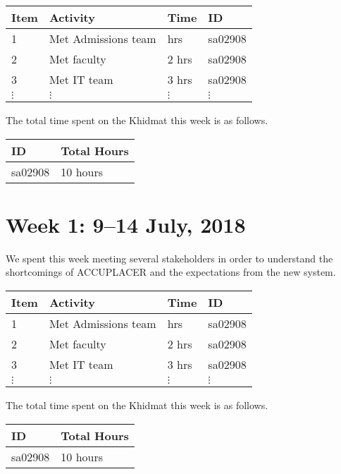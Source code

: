 \documentclass{article}
\begin{document}
\begin{tabular}{|l|l|l|l|}
  \hline
  Item  & Activity & Time & ID \\\hline\hline
  1 & Met Admissions team & hrs & sa02908 \\\hline
  2 & Met faculty & 2 hrs & sa02908 \\\hline
  3 & Met IT team & 3 hrs & sa02908 \\\hline
  $\vdots$ & $\vdots$ & $\vdots$ & $\vdots$ \\\hline
\end{tabular}

The total time spent on the Khidmat this week is as follows.

\begin{tabular}{|l|l|}
  \hline
  ID & Total Hours\\\hline\hline
  sa02908 & 10 hours\\\hline
\end{tabular}


\newpage %
\section*{Week 1: 9--14 July, 2018}

We spent this week meeting several stakeholders in order to understand the shortcomings of ACCUPLACER and the expectations from the new system.

\begin{tabular}{|l|l|l|l|}
  \hline
  Item  & Activity & Time & ID \\\hline\hline
  1 & Met Admissions team & hrs & sa02908 \\\hline
  2 & Met faculty & 2 hrs & sa02908 \\\hline
  3 & Met IT team & 3 hrs & sa02908 \\\hline
  $\vdots$ & $\vdots$ & $\vdots$ & $\vdots$ \\\hline
\end{tabular}

The total time spent on the Khidmat this week is as follows.

\begin{tabular}{|l|l|}
  \hline
  ID & Total Hours\\\hline\hline
  sa02908 & 10 hours\\\hline
\end{tabular}
\end{document}
